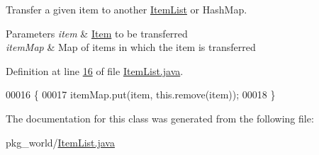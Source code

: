 Transfer a given item to another \hyperlink{classpkg__world_1_1ItemList}{Item\-List} or Hash\-Map. 


\begin{DoxyParams}{Parameters}
{\em item} & \hyperlink{classpkg__world_1_1Item}{Item} to be transferred \\
\hline
{\em item\-Map} & Map of items in which the item is transferred \\
\hline
\end{DoxyParams}


Definition at line \hyperlink{ItemList_8java_source_l00016}{16} of file \hyperlink{ItemList_8java_source}{Item\-List.\-java}.


\begin{DoxyCode}
00016                                                                      \{
00017         itemMap.put(item, this.remove(item));
00018     \}
\end{DoxyCode}


The documentation for this class was generated from the following file\-:\begin{DoxyCompactItemize}
\item 
pkg\-\_\-world/\hyperlink{ItemList_8java}{Item\-List.\-java}\end{DoxyCompactItemize}
